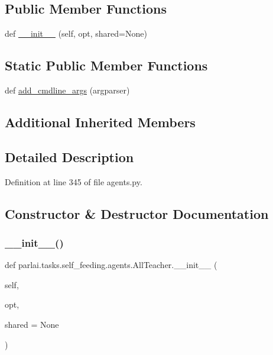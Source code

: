\subsection*{Public Member Functions}
\begin{DoxyCompactItemize}
\item 
def \hyperlink{classparlai_1_1tasks_1_1self__feeding_1_1agents_1_1AllTeacher_a2657afc24f3e110cdd61a361462feb27}{\+\_\+\+\_\+init\+\_\+\+\_\+} (self, opt, shared=None)
\end{DoxyCompactItemize}
\subsection*{Static Public Member Functions}
\begin{DoxyCompactItemize}
\item 
def \hyperlink{classparlai_1_1tasks_1_1self__feeding_1_1agents_1_1AllTeacher_aaf96c800f6f56fac5b3c014bb193caa7}{add\+\_\+cmdline\+\_\+args} (argparser)
\end{DoxyCompactItemize}
\subsection*{Additional Inherited Members}


\subsection{Detailed Description}


Definition at line 345 of file agents.\+py.



\subsection{Constructor \& Destructor Documentation}
\mbox{\label{classparlai_1_1tasks_1_1self__feeding_1_1agents_1_1AllTeacher_a2657afc24f3e110cdd61a361462feb27}} 
\subsubsection{\texorpdfstring{\+\_\+\+\_\+init\+\_\+\+\_\+()}{\_\_init\_\_()}}
{\footnotesize\ttfamily def parlai.\+tasks.\+self\+\_\+feeding.\+agents.\+All\+Teacher.\+\_\+\+\_\+init\+\_\+\+\_\+ (\begin{DoxyParamCaption}\item[{}]{self,  }\item[{}]{opt,  }\item[{}]{shared = {\ttfamily None} }\end{DoxyParamCaption})}



